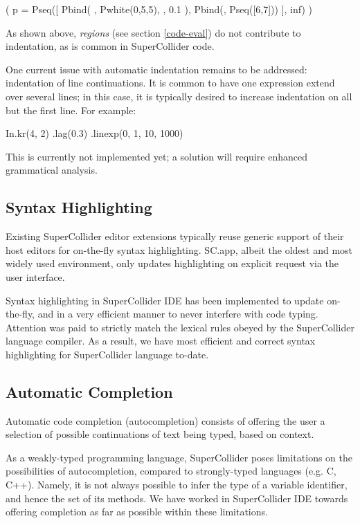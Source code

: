 \documentclass[11pt,a4paper]{article}
\begin{document}
\begin{verbatimtab}[4]
(
p = Pseq([
	Pbind(
		\degree, Pwhite(0,5,5),
		\dur, 0.1
	),
	Pbind(\degree, Pseq([6,7]))
], inf)
)
\end{verbatimtab}

As shown above, \emph{regions} (see section \ref{code-eval}) do not contribute to indentation, as is common in
SuperCollider code.

One current issue with automatic indentation remains to be addressed: indentation of line continuations. It is common
to have one expression extend over several lines; in this case, it is typically desired to increase indentation on all
but the first line. For example:

\begin{verbatimtab}[4]
In.kr(4, 2)
	.lag(0.3)
	.linexp(0, 1, 10, 1000)
\end{verbatimtab}

This is currently not implemented yet; a solution will require enhanced grammatical analysis.

\subsection{Syntax Highlighting}
\label{syntax-highlighting}

Existing SuperCollider editor extensions typically reuse generic support of their host editors for
on-the-fly syntax highlighting. SC.app, albeit the oldest and most widely used environment, only
updates highlighting on explicit request via the user interface.

Syntax highlighting in SuperCollider IDE has been implemented to update on-the-fly, and in a very
efficient manner to never interfere with code typing. Attention was paid to strictly match the
lexical rules obeyed by the SuperCollider language compiler. As a result, we have most efficient and
correct syntax highlighting for SuperCollider language to-date.

\subsection{Automatic Completion}
\label{auto-completion}

Automatic code completion (autocompletion) consists of offering the user a selection of possible
continuations of text being typed, based on context.

As a weakly-typed programming language, SuperCollider poses limitations on the possibilities of
autocompletion, compared to strongly-typed languages (e.g. C, C++). Namely, it is not always
possible to infer the type of a variable identifier, and hence the set of its methods. We have
worked in SuperCollider IDE towards offering completion as far as possible within these limitations.
\end{document}
